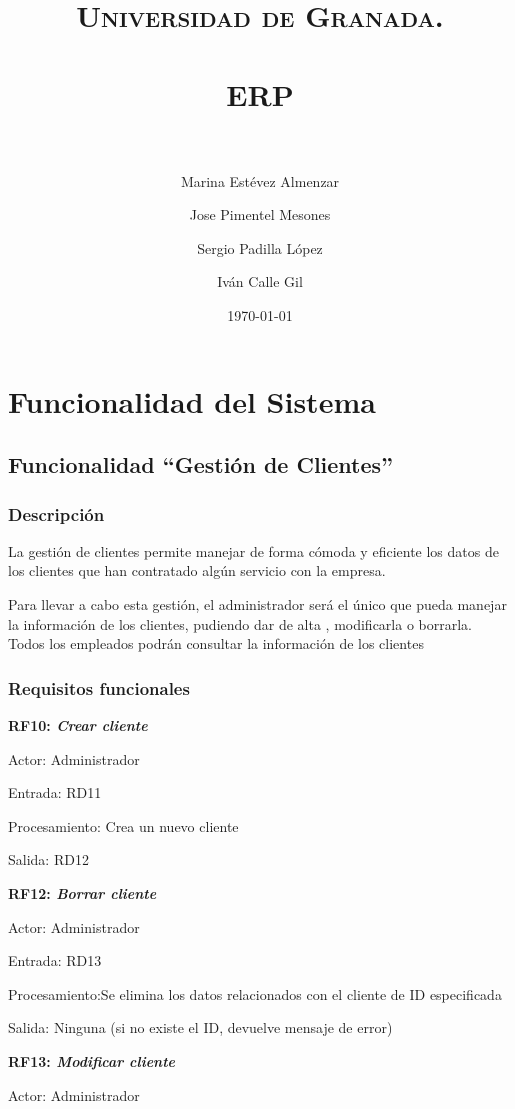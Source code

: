 \documentclass[paper=a4, fontsize=11pt, spanish]{scrartcl}
\title{
  \normalfont \normalsize
  \textsc{Universidad de Granada.} \\ [25pt]
  \horrule{0.5pt} \\[0.4cm]
  \huge ERP \\
  \horrule{2pt} \\[0.5cm]
}
\author{Marina Estévez Almenzar\\
\and
Jose Pimentel Mesones\\
\and
Sergio Padilla López\\
\and
Iván Calle Gil\\}
\date{\normalsize\today}
\begin{document}
\maketitle

\section{Funcionalidad del Sistema}

\subsection{Funcionalidad “Gestión de Clientes”}

\subsubsection{Descripción}
\setlength{\parindent}{3em} La gestión de clientes permite manejar de forma cómoda y eficiente los datos de los clientes que han contratado algún servicio con la empresa.

Para llevar a cabo esta gestión, el administrador será el único que pueda manejar la información de los clientes, pudiendo dar de alta , modificarla o borrarla.
Todos los empleados podrán consultar la información de los clientes

\subsubsection{Requisitos funcionales}
\setlength{\parindent}{0em}
\textbf{RF10: \textit{Crear cliente}}
\setlength{\parindent}{2em}

Actor: Administrador

Entrada: RD11

Procesamiento: Crea un nuevo cliente

Salida: RD12

\setlength{\parindent}{0em}
\textbf{RF12: \textit{Borrar cliente}}
\setlength{\parindent}{2em}

Actor: Administrador

Entrada: RD13

Procesamiento:Se elimina los datos relacionados con el cliente de ID especificada

Salida: Ninguna (si no existe el ID, devuelve mensaje de error)

\setlength{\parindent}{0em}
\textbf{RF13: \textit{Modificar cliente}}
\setlength{\parindent}{2em}

Actor: Administrador
\end{document}
